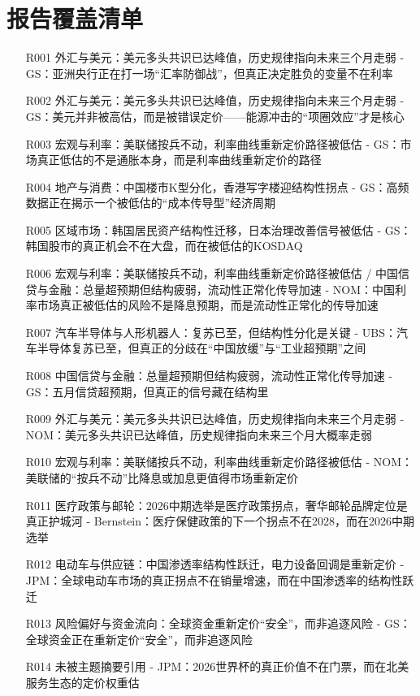 \documentclass[11pt]{ctexart}
\begin{document}
\section{报告覆盖清单}
\begin{itemize}
  \item [R001] 外汇与美元：美元多头共识已达峰值，历史规律指向未来三个月走弱 - GS：亚洲央行正在打一场“汇率防御战”，但真正决定胜负的变量不在利率
  \item [R002] 外汇与美元：美元多头共识已达峰值，历史规律指向未来三个月走弱 - GS：美元并非被高估，而是被错误定价——能源冲击的“项圈效应”才是核心
  \item [R003] 宏观与利率：美联储按兵不动，利率曲线重新定价路径被低估 - GS：市场真正低估的不是通胀本身，而是利率曲线重新定价的路径
  \item [R004] 地产与消费：中国楼市K型分化，香港写字楼迎结构性拐点 - GS：高频数据正在揭示一个被低估的“成本传导型”经济周期
  \item [R005] 区域市场：韩国居民资产结构性迁移，日本治理改善信号被低估 - GS：韩国股市的真正机会不在大盘，而在被低估的KOSDAQ
  \item [R006] 宏观与利率：美联储按兵不动，利率曲线重新定价路径被低估 / 中国信贷与金融：总量超预期但结构疲弱，流动性正常化传导加速 - NOM：中国利率市场真正被低估的风险不是降息预期，而是流动性正常化的传导加速
  \item [R007] 汽车半导体与人形机器人：复苏已至，但结构性分化是关键 - UBS：汽车半导体复苏已至，但真正的分歧在“中国放缓”与“工业超预期”之间
  \item [R008] 中国信贷与金融：总量超预期但结构疲弱，流动性正常化传导加速 - GS：五月信贷超预期，但真正的信号藏在结构里
  \item [R009] 外汇与美元：美元多头共识已达峰值，历史规律指向未来三个月走弱 - NOM：美元多头共识已达峰值，历史规律指向未来三个月大概率走弱
  \item [R010] 宏观与利率：美联储按兵不动，利率曲线重新定价路径被低估 - NOM：美联储的“按兵不动”比降息或加息更值得市场重新定价
  \item [R011] 医疗政策与邮轮：2026中期选举是医疗政策拐点，奢华邮轮品牌定位是真正护城河 - Bernstein：医疗保健政策的下一个拐点不在2028，而在2026中期选举
  \item [R012] 电动车与供应链：中国渗透率结构性跃迁，电力设备回调是重新定价 - JPM：全球电动车市场的真正拐点不在销量增速，而在中国渗透率的结构性跃迁
  \item [R013] 风险偏好与资金流向：全球资金重新定价“安全”，而非追逐风险 - GS：全球资金正在重新定价“安全”，而非追逐风险
  \item [R014] 未被主题摘要引用 - JPM：2026世界杯的真正价值不在门票，而在北美服务生态的定价权重估

\end{itemize}
\end{document}
